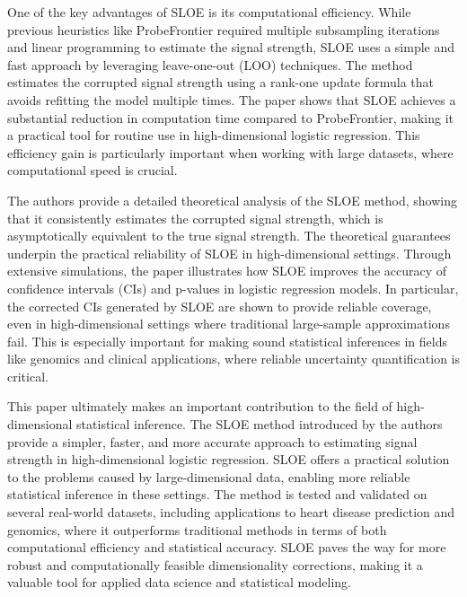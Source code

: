 \documentclass{article}
\theoremstyle{plain}
\theoremstyle{definition}
\theoremstyle{remark}
\begin{document}
One of the key advantages of SLOE is its computational efficiency. While previous heuristics like ProbeFrontier required multiple subsampling iterations and linear programming to estimate the signal strength, SLOE uses a simple and fast approach by leveraging leave-one-out (LOO) techniques. The method estimates the corrupted signal strength using a rank-one update formula that avoids refitting the model multiple times. The paper shows that SLOE achieves a substantial reduction in computation time compared to ProbeFrontier, making it a practical tool for routine use in high-dimensional logistic regression. This efficiency gain is particularly important when working with large datasets, where computational speed is crucial.

The authors provide a detailed theoretical analysis of the SLOE method, showing that it consistently estimates the corrupted signal strength, which is asymptotically equivalent to the true signal strength. The theoretical guarantees underpin the practical reliability of SLOE in high-dimensional settings. Through extensive simulations, the paper illustrates how SLOE improves the accuracy of confidence intervals (CIs) and p-values in logistic regression models. In particular, the corrected CIs generated by SLOE are shown to provide reliable coverage, even in high-dimensional settings where traditional large-sample approximations fail. This is especially important for making sound statistical inferences in fields like genomics and clinical applications, where reliable uncertainty quantification is critical.

This paper ultimately makes an important contribution to the field of high-dimensional statistical inference. The SLOE method introduced by the authors provide a simpler, faster, and more accurate approach to estimating signal strength in high-dimensional logistic regression. SLOE offers a practical solution to the problems caused by large-dimensional data, enabling more reliable statistical inference in these settings. The method is tested and validated on several real-world datasets, including applications to heart disease prediction and genomics, where it outperforms traditional methods in terms of both computational efficiency and statistical accuracy. SLOE paves the way for more robust and computationally feasible dimensionality corrections, making it a valuable tool for applied data science and statistical modeling.
\end{document}
